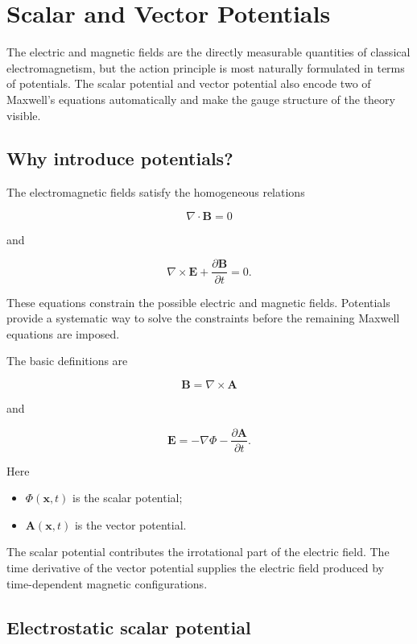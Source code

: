 \section{Scalar and Vector Potentials}
\label{sec:scalar_vector_potentials}

The electric and magnetic fields are the directly measurable quantities of classical electromagnetism, but the action principle is most naturally formulated in terms of potentials. The scalar potential and vector potential also encode two of Maxwell's equations automatically and make the gauge structure of the theory visible.

\subsection{Why introduce potentials?}

The electromagnetic fields satisfy the homogeneous relations

\[
\nabla\cdot\mathbf{B}=0
\]

and

\[
\nabla\times\mathbf{E}
+
\frac{\partial\mathbf{B}}{\partial t}
=0.
\]

These equations constrain the possible electric and magnetic fields. Potentials provide a systematic way to solve the constraints before the remaining Maxwell equations are imposed.

The basic definitions are

\[
\boxed{
\mathbf{B}
=
\nabla\times\mathbf{A}
}
\]

and

\[
\boxed{
\mathbf{E}
=
-\nabla\Phi
-
\frac{\partial\mathbf{A}}{\partial t}
}.
\]

Here

\begin{itemize}
    \item \(\Phi(\mathbf{x},t)\) is the scalar potential;
    \item \(\mathbf{A}(\mathbf{x},t)\) is the vector potential.
\end{itemize}

The scalar potential contributes the irrotational part of the electric field. The time derivative of the vector potential supplies the electric field produced by time-dependent magnetic configurations.

\subsection{Electrostatic scalar potential}

